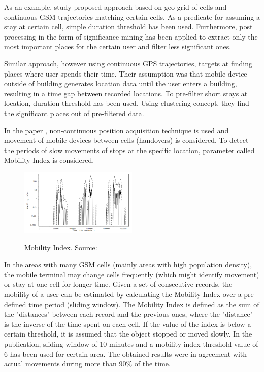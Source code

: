 As an example, study \cite{StopDet2} proposed approach based on geo-grid of cells and continuous GSM trajectories matching certain cells. As a predicate for assuming a stay at certain cell, simple duration threshold has been used. Furthermore, post processing in the form of significance mining has been applied to extract only the most important places for the certain user and filter less significant ones. 

Similar approach, however using continuous GPS trajectories, targets at finding places where user
spends their time. Their assumption was that mobile device outside of building generates location data until the user enters a building, resulting in a time gap between recorded locations. To pre-filter short stays at location, duration threshold has been used. Using clustering concept, they find the significant places out of pre-filtered data.  

In the paper \cite{MobilityIndexGIS}, non-continuous position acquisition technique is used and movement of mobile devices between cells (handovers) is considered. To detect the periods of slow movements of stops at the specific location, parameter called Mobility Index is considered. 

\begin{figure}[!ht]
	\centering
	\includegraphics[width=0.5\textwidth]{images/intro_mobility_index.png}\\
	\caption{Mobility Index. Source: \cite{MobilityIndexGIS}}
	\label{fig:introduction_mob_index}
\end{figure}

In the areas with many GSM cells (mainly areas with high population density), the mobile
terminal may change cells frequently (which might identify movement) or stay at one cell for longer time. Given a set of consecutive records, the mobility of a user can be estimated by calculating the Mobility Index over a pre-defined time period (sliding window). The Mobility Index is defined as the sum of the "distances" between each record and the previous ones, where the "distance" is the inverse of the time spent on each cell. If the value of the index is below a certain threshold, it is assumed that the object stopped or moved slowly. In the publication, sliding window of 10 minutes and a mobility index threshold value of 6 has been used for certain area. The obtained results were in agreement with actual movements during more than 90\% of the time.


